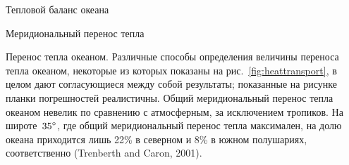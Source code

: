 \begin{chapter}{Тепловой баланс океана}
\begin{section}{Меридиональный перенос тепла}
\begin{paragraph}{Перенос тепла океаном.}
Различные способы определения величины переноса тепла океаном, некоторые из 
которых показаны на рис.~\ref{fig:heattransport}, в целом дают согласующиеся 
между собой результаты; показанные на рисунке планки погрешностей реалистичны.
Общий меридиональный перенос тепла океаном невелик по сравнению с атмосферным,
за исключением тропиков. На широте~${35}^\circ$, где общий меридиональный
перенос тепла максимален, на долю океана приходится лишь 22\%
в северном и 8\% в южном полушариях, соответственно (Trenberth and Caron, 2001).
%
\end{paragraph}
\end{section}



\end{chapter}
